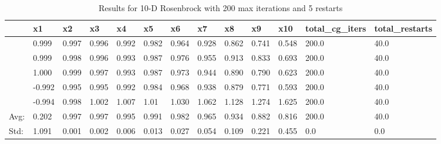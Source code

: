 \documentclass[10pt,onside]{article}
\begin{document}
\begin{description}
\begin {table}[ht]
\centering
\caption {Results for 10-D Rosenbrock with 200 max iterations and 5 restarts}
\begin{tabular}{lllllllllllll}
\toprule
{} &                      x1 &                      x2 &                      x3 &                      x4 &                      x5 &                      x6 &                      x7 &                      x8 &                      x9 &                     x10 &  total\_cg\_iters &  total\_restarts \\
\midrule
&  0.999 &  0.997&  0.996&  0.992 &  0.982 &  0.964 &  0.928 &  0.862 &  0.741 &  0.548 &           200.0 &            40.0 \\
&  0.999 &  0.998&  0.996 &  0.993 &  0.987 &  0.976 &  0.955 &  0.913 &  0.833 &  0.693 &           200.0 &            40.0 \\
&  1.000 &  0.999 &  0.997 &  0.993 &  0.987&  0.973&  0.944 &  0.890 &  0.790&  0.623 &           200.0 &            40.0 \\
& -0.992 &  0.995 &  0.995 &  0.992 &  0.984 &  0.968&  0.938&  0.879 &  0.771 &  0.593 &           200.0 &            40.0 \\
& -0.994 &  0.998 &  1.002 &  1.007 &  1.01 &  1.030 &  1.062 &  1.128 &  1.274 &  1.625 &           200.0 &            40.0 \\
\bottomrule

\bottomrule
Avg: & 0.202 & 0.997& 0.997& 0.995 & 0.991 & 0.982 & 0.965 & 0.934& 0.882 &0.816 & 200.0 & 40.0 \\
Std:& 1.091& 0.001& 0.002& 0.006&  0.013& 0.027&  0.054& 0.109 & 0.221& 0.455& 0.0 & 0.0\\
\bottomrule
\end{tabular}
\end{table}

\end{description}
\end{document}
